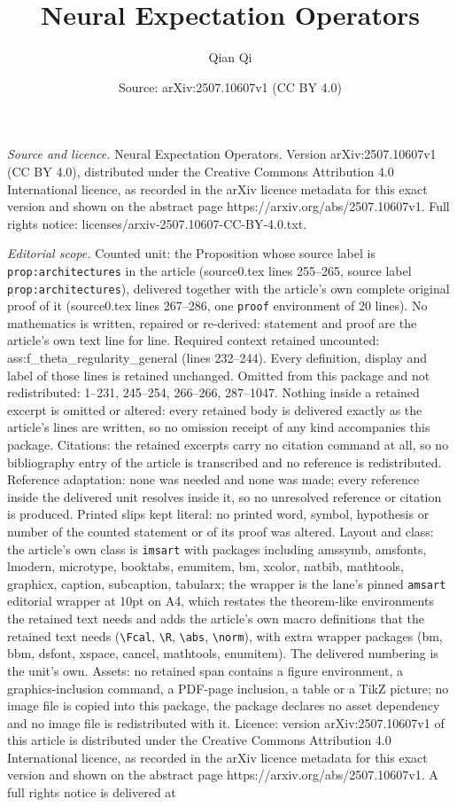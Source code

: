 \documentclass[10pt,a4paper]{amsart}
\title[Neural Expectation Operators]{Neural Expectation Operators}
\author{Qian Qi}
\date{Source: arXiv:2507.10607v1 (CC BY 4.0)}
\begin{document}
\maketitle

\noindent\emph{Source and licence.} Neural Expectation Operators. Version arXiv:2507.10607v1 (CC BY 4.0), distributed under the Creative Commons Attribution 4.0 International licence, as recorded in the arXiv licence metadata for this exact version and shown on the abstract page https://arxiv.org/abs/2507.10607v1. Full rights notice: licenses/arxiv-2507.10607-CC-BY-4.0.txt.\par\smallskip

\noindent\textit{Editorial scope.} Counted unit: the Proposition whose source label is \texttt{prop:architectures} in the article (source0.tex lines 255--265, source label \texttt{prop:architectures}), delivered together with the article's own complete original proof of it (source0.tex lines 267--286, one \texttt{proof} environment of 20 lines). No mathematics is written, repaired or re-derived: statement and proof are the article's own text line for line. Required context retained uncounted: ass:f\_theta\_regularity\_general (lines 232--244). Every definition, display and label of those lines is retained unchanged. Omitted from this package and not redistributed: 1--231, 245--254, 266--266, 287--1047. Nothing inside a retained excerpt is omitted or altered: every retained body is delivered exactly as the article's lines are written, so no omission receipt of any kind accompanies this package. Citations: the retained excerpts carry no citation command at all, so no bibliography entry of the article is transcribed and no reference is redistributed. Reference adaptation: none was needed and none was made; every reference inside the delivered unit resolves inside it, so no unresolved reference or citation is produced. Printed slips kept literal: no printed word, symbol, hypothesis or number of the counted statement or of its proof was altered. Layout and class: the article's own class is \texttt{imsart} with packages including amssymb, amsfonts, lmodern, microtype, booktabs, enumitem, bm, xcolor, natbib, mathtools, graphicx, caption, subcaption, tabularx; the wrapper is the lane's pinned \texttt{amsart} editorial wrapper at 10pt on A4, which restates the theorem-like environments the retained text needs and adds the article's own macro definitions that the retained text needs (\texttt{\textbackslash Fcal}, \texttt{\textbackslash R}, \texttt{\textbackslash abs}, \texttt{\textbackslash norm}), with extra wrapper packages (bm, bbm, dsfont, xspace, cancel, mathtools, enumitem). The delivered numbering is the unit's own. Assets: no retained span contains a figure environment, a graphics-inclusion command, a PDF-page inclusion, a table or a TikZ picture; no image file is copied into this package, the package declares no asset dependency and no image file is redistributed with it. Licence: version arXiv:2507.10607v1 of this article is distributed under the Creative Commons Attribution 4.0 International licence, as recorded in the arXiv licence metadata for this exact version and shown on the abstract page https://arxiv.org/abs/2507.10607v1. A full rights notice is delivered at 
\end{document}
